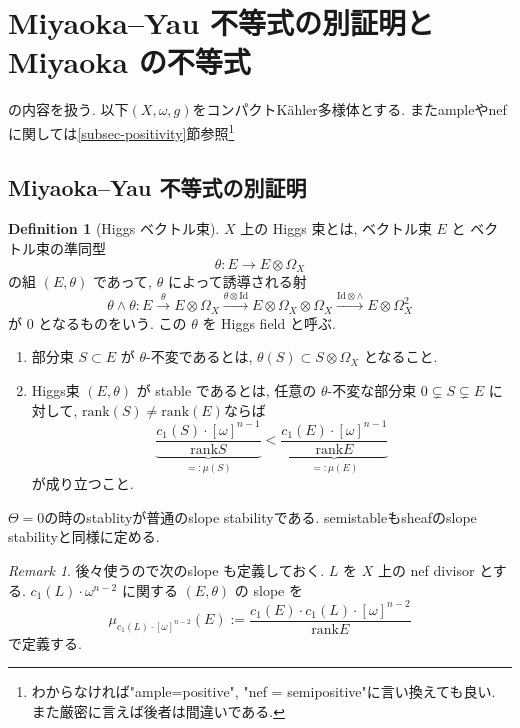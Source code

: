 \documentclass[dvipdfmx,a4paper,11pt]{article} %
\theoremstyle{definition}
\newtheorem{defn}[thm]{Definition}
\theoremstyle{remark}
\newtheorem{rem}[thm]{Remark}
\numberwithin{equation}{section}
\begin{document}
\newpage

\section{Miyaoka--Yau 不等式の別証明と Miyaoka の不等式}
\label{sec-Miyaoka}
\cite{Miy87, Cao13, Ou23, IM22, IMM24}の内容を扱う. 
以下$(X, \omega, g)$をコンパクトK\"ahler多様体とする. 
またampleやnefに関しては\ref{subsec-positivity}節参照\footnote{わからなければ"ample=positive", "nef = semipositive"に言い換えても良い. また厳密に言えば後者は間違いである. }

\subsection{Miyaoka--Yau 不等式の別証明}

\begin{defn}[Higgs ベクトル束]
\(X\) 上の Higgs 束とは, ベクトル束 \(E\) と 
ベクトル束の準同型
\[
\theta\colon E\longrightarrow E\otimes \Omega_X
\]
の組 \((E,\theta)\) であって, \(\theta\) によって誘導される射
\[
\theta\wedge\theta\colon 
E
\overset{\theta}{\longrightarrow }E\otimes \Omega_X
\overset{\theta \otimes \mathrm{Id}}{\longrightarrow }E\otimes \Omega_X \otimes \Omega_X
\overset{\mathrm{Id} \otimes \wedge}{\longrightarrow }
E\otimes \Omega_X^2
\]
が \(0\) となるものをいう. この \(\theta\) を Higgs field と呼ぶ.

\begin{enumerate}
\item 部分束 \(S\subset E\) が \(\theta\)-不変であるとは,
\(
\theta(S) \subset  
S\otimes \Omega_X
\)
となること. 
\item Higgs束 \((E,\theta)\) が stable であるとは, 
任意の \(\theta\)-不変な部分束
\(
0\subsetneq S\subsetneq E
\)
に対して, $\mathrm{rank}(S) \neq \mathrm{rank}(E)$ならば
\[
\underbrace{\frac{c_1(S)\cdot [\omega]^{n-1}}{\mathrm{rank}S}}_{=:\mu(S)}
<
\underbrace{\frac{c_1(E)\cdot [\omega]^{n-1}}{\mathrm{rank}E}}_{=:\mu(E)}
\]
が成り立つこと. 
\end{enumerate}
\end{defn}
$\Theta=0$の時のstablityが普通のslope stabilityである. 
semistableもsheafのslope stabilityと同様に定める. 
\begin{rem}
後々使うので次のslope も定義しておく. 
\(L\) を \(X\) 上の nef  divisor とする. \(c_1(L) \cdot  \omega^{n-2}\) に関する \((E,\theta)\) の slope を
\[
\mu_{c_1(L) \cdot  [\omega]^{n-2}}(E)
:=
\frac{c_1(E)\cdot c_1(L) \cdot [\omega]^{n-2}}{\mathrm{rank}E}
\]
で定義する.
\end{rem}
\end{document}
